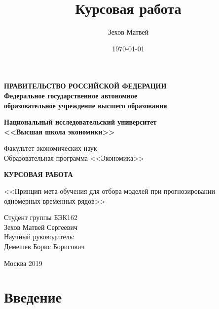 \documentclass[a4paper,12pt]{article}
\author{Зехов Матвей}
\title{Курсовая работа}
\date{\today}
\begin{document}
	
	
\thispagestyle{empty}
\begin{center}
	\textbf{ПРАВИТЕЛЬСТВО РОССИЙСКОЙ ФЕДЕРАЦИИ}\\
	\vspace{2ex}
	\textbf{Федеральное государственное автономное\\ образовательное учреждение высшего образования}
	
	\vspace{2ex}
	
	\textbf{Национальный исследовательский университет \\ <<Высшая школа экономики>>}
	
	\vspace{8ex}
	\begin{flushright}
		Факультет экономических наук\\
		Образовательная программа <<Экономика>>
	\end{flushright}
\end{center}
\vspace{9ex}

\begin{center}
	{\textbf{КУРСОВАЯ РАБОТА
	}}
	\vspace{1ex}
	
	<<Принцип мета-обучения для отбора моделей при прогнозировании одномерных временных рядов>>
\end{center}
\vspace{1ex}
\begin{flushright}
	\noindent
	Студент группы БЭК162\\Зехов Матвей Сергеевич\\
	\vspace{13ex}
	Научный руководитель:\\
	Демешев Борис Борисович
	
\end{flushright}	

\vfill

\begin{center}
	Москва 2019
	
\end{center}

\newpage

\tableofcontents
	
\newpage

\section{Введение}
\end{document}

